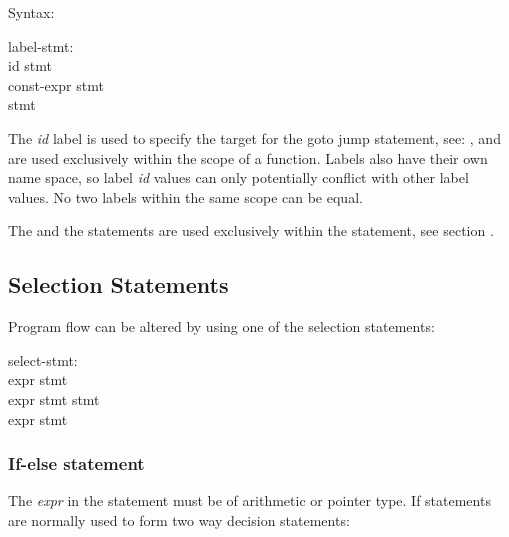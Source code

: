Syntax:
\begin{production}
\bp
{
label-stmt:\\
\>      id \T{:} stmt\\
\>       const-expr \T{:} stmt\\
\>       \T{:} stmt
}
\end{production}

The {\it id} label is used to specify the target for the goto jump
statement, see: , and are used exclusively
within the scope of a function. Labels  also have their  own
name space, so label {\it id} values can only potentially conflict with other 
label values. No two labels within the same scope can be equal.

The  and the 
 statements are used exclusively within the
 statement, see section .

\subsection{Selection Statements}
\label{sec:SelectionStatements}

Program flow can be altered by using one of the selection
statements:

\begin{production}
\bp
{
select-stmt:\\
\>       \T{(} expr \T{)} stmt\\
\>       \T{(} expr \T{)} stmt  stmt\\
\>       \T{(} expr \T{)} stmt
}
\end{production}


\subsubsection{If-else statement}
\label{sec:IfElseStatement}

The {\it expr} in the  statement must be of arithmetic
or pointer type. If statements are normally used to form two 
way decision statements:

\begin{production}
\end{production}

